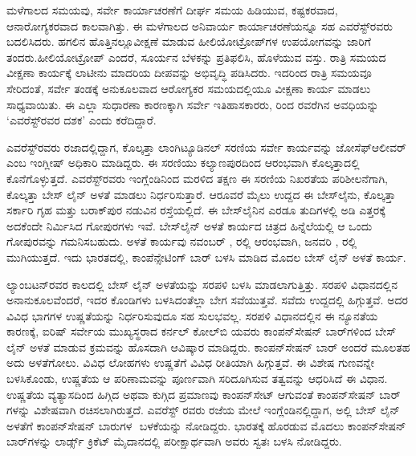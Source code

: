 ಮಳೆಗಾಲದ ಸಮಯವು, ಸರ್ವೇ ಕಾರ್ಯಾಚರಣೆಗೆ ದೀರ್ಘ ಸಮಯ ಹಿಡಿಯುವ, ಕಷ್ಟಕರವಾದ, ಆನಾರೋಗ್ಯಕರವಾದ ಕಾಲವಾಗಿತ್ತು. ಈ ಮಳೆಗಾಲದ ಅನಿವಾರ್ಯ ಕಾರ್ಯಾಚರಣೆಯನ್ನೂ ಸಹ ಎವರೆಸ್ಟ್​ರವರು ಬದಲಿಸಿದರು. ಹಗಲಿನ ಹೊತ್ತಿನಲ್ಲೂ\break ವೀಕ್ಷಣೆ ಮಾಡುವ ಹೀಲಿಯೋಟ್ರೋಪ್​ಗಳ ಉಪಯೋಗವನ್ನು ಜಾರಿಗೆ ತಂದರು.\break ಹೀಲಿಯೋಟ್ರೋಪ್​ ಎಂದರೆ, ಸೂರ್ಯನ ಬೆಳಕನ್ನು ಪ್ರತಿಫಲಿಸಿ, ಹೊಳೆಯುವ ವಸ್ತು. ರಾತ್ರಿ ಸಮಯದ ವೀಕ್ಷಣಾ ಕಾರ್ಯಕ್ಕೆ ಲಾಟೀನು ಮಾದರಿಯ ದೀಪವನ್ನು ಅಭಿವೃದ್ಧಿ ಪಡಿಸಿದರು. ಇದರಿಂದ ರಾತ್ರಿ ಸಮಯವೂ ಸೇರಿದಂತೆ, ಸರ್ವೇ ತಂಡಕ್ಕೆ ಅನುಕೂಲವಾದ ಆರೋಗ್ಯಕರ ಸಮಯದಲ್ಲಿಯೂ ವೀಕ್ಷಣಾ ಕಾರ್ಯ ಮಾಡಲು ಸಾಧ್ಯವಾಯಿತು. ಈ ಎಲ್ಲಾ ಸುಧಾರಣಾ ಕಾರಣಕ್ಕಾಗಿ ಸರ್ವೇ ಇತಿಹಾಸಕಾರರು,  ರಿಂದ  ರವರೆಗಿನ ಅವಧಿಯನ್ನು ‘ಎವರೆಸ್ಟ್​ರವರ ದಶಕ’ ಎಂದು ಕರೆದಿದ್ದಾರೆ.

ಎವರೆಸ್ಟ್​ರವರು ರಜಾದಲ್ಲಿದ್ದಾಗ, ಕೊಲ್ಕತ್ತಾ ಲಾಂಗಿಟ್ಯೂಡಿನಲ್​ ಸರಣಿಯ ಸರ್ವೇ ಕಾರ್ಯವನ್ನು ಜೋಸೆಫ್​ ಆಲೀವರ್​ ಎಂಬ ಇಂಗ್ಲೀಷ್​ ಅಧಿಕಾರಿ ಮಾಡಿದ್ದರು. ಈ ಸರಣಿಯು ಕಲ್ಯಾಣಪುರದಿಂದ ಆರಂಭವಾಗಿ ಕೊಲ್ಕತ್ತಾದಲ್ಲಿ ಕೊನೆಗೊಳ್ಳುತ್ತದೆ. ಎವರೆಸ್ಟ್​ರವರು ಇಂಗ್ಲೆಂಡಿನಿಂದ ಮರಳಿದ ತಕ್ಷಣ ಈ ಸರಣಿಯ ನಿಖರತೆಯ ಪರಿಶೀಲನೆಗಾಗಿ, ಕೊಲ್ಕತ್ತಾ ಬೇಸ್​ ಲೈನ್​ ಅಳತೆ ಮಾಡಲು ನಿರ್ಧರಿಸುತ್ತಾರೆ. ಆರೂವರೆ ಮೈಲು ಉದ್ದದ ಈ ಬೇಸ್​ಲೈನು, ಕೊಲ್ಕತ್ತಾ ಸರ್ಕಾರಿ ಗೃಹ ಮತ್ತು ಬರಾಕ್​ಪುರ ನಡುವಿನ ರಸ್ತೆಯಲ್ಲಿದೆ. ಈ ಬೇಸ್​ಲೈನಿನ ಎರಡೂ ತುದಿಗಳಲ್ಲಿ  ಅಡಿ ಎತ್ತರಕ್ಕೆ ಅದಕೆಂದೇ ನಿರ್ಮಿಸಿದ ಗೋಪುರಗಳು ಇವೆ. ಬೇಸ್‌ಲೈನ್ ಅಳತೆ ಕಾರ್ಯದ ಚಿತ್ರದ ಹಿನ್ನೆಲೆಯಲ್ಲಿ ಆ ಒಂದು ಗೋಪುರವನ್ನು ಗಮನಿಸಬಹುದು. ಅಳತೆ ಕಾರ್ಯವು ನವಂಬರ್​ ,  ರಲ್ಲಿ ಆರಂಭವಾಗಿ, ಜನವರಿ ,  ರಲ್ಲಿ ಮುಗಿಯುತ್ತದೆ. ಇದು ಭಾರತದಲ್ಲಿ, ಕಾಂಪೆನ್ಸೇಟಿಂಗ್​ ಬಾರ್​ ಬಳಸಿ ಮಾಡಿದ ಮೊದಲ ಬೇಸ್​ ಲೈನ್​ ಅಳತೆ ಕಾರ್ಯ.

ಲ್ಯಾಂಬಟನ್​ರವರ ಕಾಲದಲ್ಲಿ ಬೇಸ್​ ಲೈನ್​ ಅಳತೆಯನ್ನು ಸರಪಳಿ ಬಳಸಿ ಮಾಡಲಾಗುತ್ತಿತ್ತು. ಸರಪಳಿ ವಿಧಾನದಲ್ಲಿನ ಅನಾನುಕೂಲವೆಂದರೆ, ಇದರ ಕೊಂಡಿಗಳು ಬಳಸಿದಂತೆಲ್ಲಾ ಬೇಗ ಸವೆಯುತ್ತವೆ. ಸವೆದು ಉದ್ದದಲ್ಲಿ ಹಿಗ್ಗುತ್ತವೆ. ಅದರ ವಿವಿಧ ಭಾಗಗಳ ಉಷ್ಣತೆಯನ್ನು ನಿರ್ಧರಿಸುವುದೂ ಸಹ ಸುಲಭವಲ್ಲ. ಸರಪಳಿ ವಿಧಾನದಲ್ಲಿನ ಈ ನ್ಯೂನತೆಯ ಕಾರಣಕ್ಕೆ, ಐರಿಷ್​ ಸರ್ವೇಯ ಮುಖ್ಯಸ್ಥರಾದ ಕರ್ನಲ್​ ಕೋಲ್​ಬಿ ಯವರು ಕಾಂಪನ್​ಸೇಷನ್​ ಬಾರ್​ಗಳಿಂದ ಬೇಸ್​ ಲೈನ್​ ಅಳತೆ ಮಾಡುವ ಕ್ರಮವನ್ನು ಹೊಸದಾಗಿ ಆವಿಷ್ಕಾರ ಮಾಡಿದ್ದರು. ಕಾಂಪನ್​ಸೇಷನ್​ ಬಾರ್​ ಅಂದರೆ ಮೂಲತಹ ಅದು ಅಳತೆಗೋಲು. ವಿವಿಧ ಲೋಹಗಳು ಉಷ್ಣತೆಗೆ ವಿವಿಧ ರೀತಿಯಾಗಿ ಹಿಗ್ಗುತ್ತವೆ. ಈ ವಿಶೇಷ ಗುಣವನ್ನೇ ಬಳಸಿಕೊಂಡು, ಉಷ್ಣತೆಯ ಆ ಪರಿಣಾಮವನ್ನು ಪೂರ್ಣವಾಗಿ ಸರಿದೂಗಿಸುವ ತತ್ವವನ್ನು ಆಧರಿಸಿದೆ ಈ ವಿಧಾನ. ಉಷ್ಣತೆಯ ವ್ಯತ್ಯಾಸದಿಂದ ಹಿಗ್ಗಿದ ಅಥವಾ ಕುಗ್ಗಿದ ಪ್ರಮಾಣವು ಕಾಂಪನ್​ಸೇಟ್​ ಆಗುವಂತೆ ಕಾಂಪನ್​ಸೇಷನ್​ ಬಾರ್​ಗಳನ್ನು ವಿಶೇಷವಾಗಿ ರಚಿಸಲಾಗಿರುತ್ತದೆ. ಎವರೆಸ್ಟ್​ ರವರು ರಜೆಯ ಮೇಲೆ ಇಂಗ್ಲೆಂಡಿನಲ್ಲಿದ್ದಾಗ, ಅಲ್ಲಿ ಬೇಸ್​ ಲೈನ್​ ಅಳತೆಗೆ ಕಾಂಪನ್​ಸೇಷನ್​ ಬಾರುಗಳ ​ ಬಳಕೆಯನ್ನು ನೋಡಿದ್ದರು. ಭಾರತಕ್ಕೆ ಹೊರಡುವ ಮೊದಲು ಕಾಂಪನ್​ಸೇಷನ್​ ಬಾರ್​ಗಳನ್ನು ಲಾರ್ಡ್ಸ್ ಕ್ರಿಕೆಟ್​ ಮೈದಾನದಲ್ಲಿ ಪರೀಕ್ಷಾರ್ಥವಾಗಿ ಅವರು ಸ್ವತಃ ಬಳಸಿ ನೋಡಿದ್ದರು.

